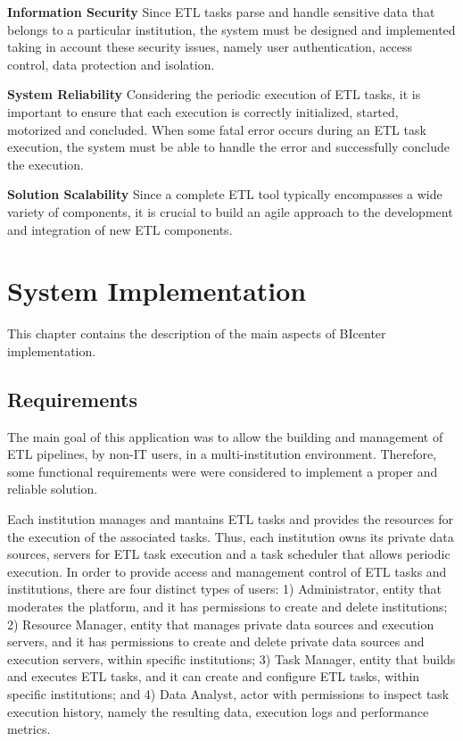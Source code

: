 \documentclass[
  11pt,
]{krantz}
\begin{document}
\textbf{Information Security}
Since ETL tasks parse and handle sensitive data that belongs to a particular institution, the system must be designed and implemented taking in account these security issues, namely user authentication, access control, data protection and isolation.

\textbf{System Reliability}
Considering the periodic execution of ETL tasks, it is important to ensure that each execution is correctly initialized, started, motorized and concluded. When some fatal error occurs during an ETL task execution, the system must be able to handle the error and successfully conclude the execution.

\textbf{Solution Scalability}
Since a complete ETL tool typically encompasses a wide variety of components, it is crucial to build an agile approach to the development and integration of new ETL components.

\hypertarget{system-implementation}{%
\chapter{System Implementation}\label{system-implementation}}

This chapter contains the description of the main aspects of BIcenter implementation.

\hypertarget{requirements}{%
\section{Requirements}\label{requirements}}

The main goal of this application was to allow the building and management of ETL pipelines, by non-IT users, in a multi-institution environment. Therefore, some functional requirements were were considered to implement a proper and reliable solution.

Each institution manages and mantains ETL tasks and provides the resources for the execution of the associated tasks. Thus, each institution owns its private data sources, servers for ETL task execution and a task scheduler that allows periodic execution. In order to provide access and management control of ETL tasks and institutions, there are four distinct types of users: 1) Administrator, entity that moderates the platform, and it has permissions to create and delete institutions; 2) Resource Manager, entity that manages private data sources and execution servers, and it has permissions to create and delete private data sources and execution servers, within specific institutions; 3) Task Manager, entity that builds and executes ETL tasks, and it can create and configure ETL tasks, within specific institutions; and 4) Data Analyst, actor with permissions to inspect task execution history, namely the resulting data, execution logs and performance metrics.
\end{document}
